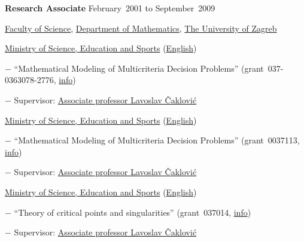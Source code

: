 \documentclass[10pt]{article}
\begin{document}
\textbf{Research Associate} \hfill {February~2001 to September~2009}
\begin{innerlist}

  \item[] \href{http://www.pmf.unizg.hr/}{Faculty of Science}, \href{http://www.math.pmf.unizg.hr/}{Department of Mathematics}, \href{http://www.unizg.hr/}{The University of Zagreb}
  \begin{innerlist}
    \item \href{http://www.mzos.hr/}{Ministry of Science, Education and Sports} (\href{http://public.mzos.hr/Default.aspx?sec=2428}{English})
    \begin{innerlist}
      \item[$-$] ``Mathematical Modeling of Multicriteria Decision Problems''
          (grant~037-0363078-2776, \href{http://zprojekti.mzos.hr/page.aspx?pid=96&lid=2}{info})
      \item[$-$] Supervisor: \href{http://www.math.pmf.unizg.hr/Default.aspx?art=2355}{Associate professor Lavoslav Čaklović}
    \end{innerlist}
    \item \href{http://www.mzos.hr/}{Ministry of Science, Education and Sports} (\href{http://public.mzos.hr/Default.aspx?sec=2428}{English})
    \begin{innerlist}
      \item[$-$] ``Mathematical Modeling of Multicriteria Decision Problems'' (grant~0037113, \href{http://zprojekti.mzos.hr/page.aspx?pid=6&lid=2}{info})
      \item[$-$] Supervisor: \href{http://www.math.pmf.unizg.hr/Default.aspx?art=2355}{Associate professor Lavoslav Čaklović}
    \end{innerlist}
    \item \href{http://www.mzos.hr/}{Ministry of Science, Education and Sports} (\href{http://public.mzos.hr/Default.aspx?sec=2428}{English})
    \begin{innerlist}
      \item[$-$] ``Theory of critical points and singularities'' (grant~037014, \href{http://zprojekti.mzos.hr/page.aspx?pid=6&lid=2}{info})
      \item[$-$] Supervisor: \href{http://www.math.pmf.unizg.hr/Default.aspx?art=2355}{Associate professor Lavoslav Čaklović}
    \end{innerlist}
  \end{innerlist}
\end{innerlist}
\end{document}
